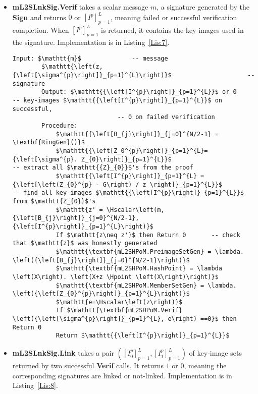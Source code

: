 \documentclass{mathcryptology} %
\newcommand{\Hpoint}{\textbf{H}_{\textbf{point}}}
\newcommand{\Hscalar}{\textbf{H}_{\textbf{scalar}}}
\theoremstyle{title}
\theoremstyle{titleof}
\begin{document}
\begin{itemize}
        \item \textbf{mL2SLnkSig.Verif} takes a scalar message $m$, a signature generated by the \textbf{Sign} and returns $0$ or ${\left[I^{p}\right]}_{p=1}^{L}$, meaning failed or successful verification completion. When ${\left[I^{p}\right]}_{p=1}^{L}$ is returned, it contains the key-images used in the signature. Implementation is in Listing~\ref{Lis:7}.

        \begin{mdframed}[backgroundcolor=black!10!white]
        \begin{lstlisting}[caption={\textbf{mL2SLnkSig.Verif} implementation.},label={Lis:7}]
        Input: $\mathtt{m}$              -- message
        $\mathtt{\left(z, {\left[\sigma^{p}\right]}_{p=1}^{L}\right)}$                     -- signature
        Output: $\mathtt{{\left[I^{p}\right]}_{p=1}^{L}}$ or 0        -- key-images $\mathtt{{\left[I^{p}\right]}_{p=1}^{L}}$ on successful,
                             -- 0 on failed verification
        Procedure:
            $\mathtt{{\left[B_{j}\right]}_{j=0}^{N/2-1} = \textbf{RingGen}()}$
            $\mathtt{{\left[Z_0^{p}\right]}_{p=1}^{L}={\left[\sigma^{p}. Z_{0}\right]}_{p=1}^{L}}$                        -- extract all $\mathtt{{Z}_{0}}$'s from the proof
            $\mathtt{{\left[I^{p}\right]}_{p=1}^{L} = {\left[\left(Z_{0}^{p} - G\right) / z \right]}_{p=1}^{L}}$                        -- find all key-images $\mathtt{{\left[I^{p}\right]}_{p=1}^{L}}$ from $\mathtt{Z_{0}}$'s
            $\mathtt{z' = \Hscalar\left(m, {\left[B_{j}\right]}_{j=0}^{N/2-1}, {\left[I^{p}\right]}_{p=1}^{L}\right)}$
            If $\mathtt{z\neq z'}$ then Return 0       -- check that $\mathtt{z}$ was honestly generated
            $\mathtt{\textbf{mL2SHPoM.PreimageSetGen} = \lambda. \left({\left[B_{j}\right]}_{j=0}^{N/2-1}\right)}$
            $\mathtt{\textbf{mL2SHPoM.HashPoint} = \lambda \left(X\right). \left(X+z \Hpoint \left(X\right)\right)}$
            $\mathtt{\textbf{mL2SHPoM.MemberSetGen} = \lambda. \left({\left[Z_{0}^{p}\right]}_{p=1}^{L}\right)}$
            $\mathtt{e=\Hscalar\left(z\right)}$
            If $\mathtt{\textbf{mL2SHPoM.Verif} \left({\left[\sigma^{p}\right]}_{p=1}^{L}, e\right) ==0}$ then Return 0
            Return $\mathtt{{\left[I^{p}\right]}_{p=1}^{L}}$
        \end{lstlisting}
        \end{mdframed}

        \item \textbf{mL2SLnkSig.Link} takes a pair $\left({\left[ I_{0}^{p}\right]}_{p=1}^{L},{\left[I_{1}^{p}\right]}_{p=1}^{L}\right)$ of key-image sets returned by two successful \textbf{Verif} calls. It returns $1$ or $0$, meaning the corresponding signatures are linked or not-linked. Implementation is in Listing~\ref{Lis:8}.


\end{itemize}
\end{document}
